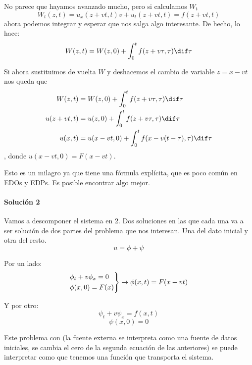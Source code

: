 			No parece que hayamos avanzado mucho, pero si calculamos $W_t$ \[
				W_t(z,t) = u_x(z + vt, t)v + u_t(z+vt, t) = f(z + vt, t)
			\] ahora podemos integrar y esperar que nos salga algo interesante. De hecho, lo hace:
			\[ W(z,t) = W(z,0) + \int^{t}_{0} f(z+v\tau, \tau)\dif\tau \]

			Si ahora sustituimos de vuelta $W$ y deshacemos el cambio de variable $z = x -vt$ nos queda que \begin{align*}
			W(z,t) &= W(z,0) + \int^{t}_{0} f(z+v\tau, \tau)\dif\tau \\
			u(z + vt, t) &= u(z,0) + \int^{t}_{0} f(z+v\tau, \tau) \dif \tau \\
			u(x,t) &= u(x-vt,0)+ \int^{t}_{0} f(x-v(t-\tau),\tau) \dif \tau
			\end{align*}, donde $u(x-vt,0) = F(x-vt)$.

			Esto es un milagro ya que tiene una fórmula explícita, que es poco común en EDOs y EDPs. Es posible encontrar algo mejor.

		\paragraph{Solución 2}

			Vamos a descomponer el sistema en 2. Dos soluciones en las que cada una va a ser solución de dos partes del problema que nos interesan. Una del dato inicial y otra del resto.
			$$u = \phi + \psi$$

			Por un lado:
			$$
			\begin{rcases}
				\phi_t + v\phi_x = 0 \\
				\phi(x,0) = F(x)
			\end{rcases}
			\rightarrow \phi(x,t) = F(x-vt)
			$$

			Y por otro:
			$$\psi_t + v\psi_x = f(x,t)$$
			$$\psi(x,0) = 0$$

			Este problema con  (la fuente externa se interpreta como una fuente de datos iniciales, se cambia el cero de la segunda ecuación de las anteriores) se puede interpretar como que tenemos una función que transporta el sistema.

			\begin{figure}[hbtp]
				\centering
				\caption{}
				\label{fig:interseccionCaracteristica}
			\end{figure}



